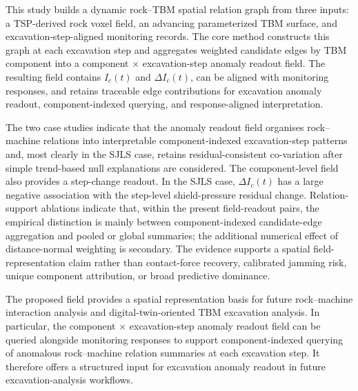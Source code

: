This study builds a dynamic rock--TBM spatial relation graph
from three inputs: a TSP-derived rock voxel field, an advancing parameterized
TBM surface, and excavation-step-aligned monitoring records. The core method
constructs this graph at each excavation step and aggregates weighted candidate
edges by TBM component into a component
$\times$ excavation-step anomaly readout field. The resulting field
contains $I_c(t)$ and $\Delta I_c(t)$, can be aligned with monitoring
responses, and retains traceable edge contributions for excavation anomaly
readout, component-indexed querying, and response-aligned interpretation.

The two case studies indicate that the anomaly readout field organises
rock--machine relations into interpretable component-indexed excavation-step
patterns and, most clearly in the SJLS case, retains residual-consistent
co-variation after simple trend-based null explanations are considered. The
component-level field also provides a step-change readout. In the SJLS case,
$\Delta I_c(t)$ has a large negative association with the step-level
shield-pressure residual change. Relation-support ablations indicate that,
within the present field-readout pairs, the empirical distinction is mainly
between component-indexed candidate-edge aggregation and pooled or global
summaries; the additional numerical effect of distance-normal weighting is
secondary. The evidence supports a spatial field-representation claim rather
than contact-force recovery, calibrated jamming
risk, unique component attribution, or broad predictive dominance.

The proposed field provides a spatial representation basis for future
rock--machine interaction analysis and digital-twin-oriented TBM excavation
analysis. In particular, the component $\times$ excavation-step anomaly
readout field can be queried alongside monitoring responses to support
component-indexed querying of anomalous rock--machine relation summaries at
each excavation step. It therefore offers a structured input for excavation
anomaly readout in future excavation-analysis workflows.
